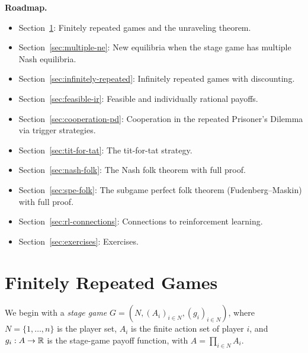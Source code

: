 \documentclass[11pt,a4paper]{article}
\begin{document}
\noindent\textbf{Roadmap.}
\begin{itemize}
    \item Section~\ref{sec:finitely-repeated}: Finitely repeated games and
    the unraveling theorem.
    \item Section~\ref{sec:multiple-ne}: New equilibria when the stage game
    has multiple Nash equilibria.
    \item Section~\ref{sec:infinitely-repeated}: Infinitely repeated games
    with discounting.
    \item Section~\ref{sec:feasible-ir}: Feasible and individually rational
    payoffs.
    \item Section~\ref{sec:cooperation-pd}: Cooperation in the repeated
    Prisoner's Dilemma via trigger strategies.
    \item Section~\ref{sec:tit-for-tat}: The tit-for-tat strategy.
    \item Section~\ref{sec:nash-folk}: The Nash folk theorem with full proof.
    \item Section~\ref{sec:spe-folk}: The subgame perfect folk theorem
    (Fudenberg--Maskin) with full proof.
    \item Section~\ref{sec:rl-connections}: Connections to reinforcement
    learning.
    \item Section~\ref{sec:exercises}: Exercises.
\end{itemize}


\section{Finitely Repeated Games}
\label{sec:finitely-repeated}

We begin with a \emph{stage game}
$G = (N, (A_i)_{i \in N}, (g_i)_{i \in N})$, where $N = \{1, \ldots, n\}$
is the player set, $A_i$ is the finite action set of player $i$, and
$g_i : A \to \mathbb{R}$ is the stage-game payoff function, with
$A = \prod_{i \in N} A_i$.
\end{document}
